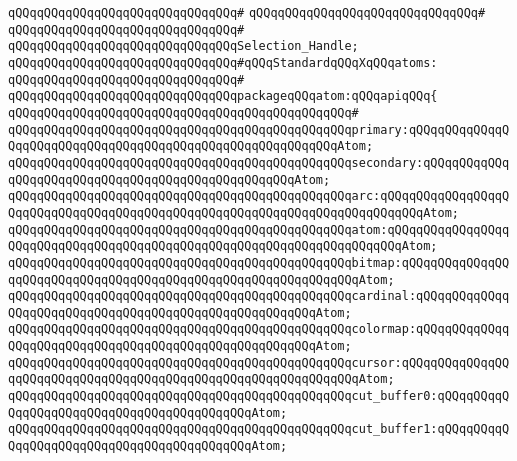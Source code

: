 \verb|qQQqqQQqqQQqqQQqqQQqqQQqqQQqqQQq#|\newline
\verb|qQQqqQQqqQQqqQQqqQQqqQQqqQQqqQQq#|\newline
\verb|qQQqqQQqqQQqqQQqqQQqqQQqqQQqqQQq#|\newline
\newline
\verb|qQQqqQQqqQQqqQQqqQQqqQQqqQQqqQQqSelection_Handle;|\newline
\newline
\verb|qQQqqQQqqQQqqQQqqQQqqQQqqQQqqQQq#qQQqStandardqQQqXqQQqatoms:|\newline
\verb|qQQqqQQqqQQqqQQqqQQqqQQqqQQqqQQq#|\newline
\verb|qQQqqQQqqQQqqQQqqQQqqQQqqQQqqQQqpackageqQQqatom:qQQqapiqQQq{|\newline
\verb|qQQqqQQqqQQqqQQqqQQqqQQqqQQqqQQqqQQqqQQqqQQqqQQq#|\newline
\verb|qQQqqQQqqQQqqQQqqQQqqQQqqQQqqQQqqQQqqQQqqQQqqQQqprimary:qQQqqQQqqQQqqQQqqQQqqQQqqQQqqQQqqQQqqQQqqQQqqQQqqQQqqQQqqQQqAtom;|\newline
\verb|qQQqqQQqqQQqqQQqqQQqqQQqqQQqqQQqqQQqqQQqqQQqqQQqsecondary:qQQqqQQqqQQqqQQqqQQqqQQqqQQqqQQqqQQqqQQqqQQqqQQqqQQqAtom;|\newline
\verb|qQQqqQQqqQQqqQQqqQQqqQQqqQQqqQQqqQQqqQQqqQQqqQQqarc:qQQqqQQqqQQqqQQqqQQqqQQqqQQqqQQqqQQqqQQqqQQqqQQqqQQqqQQqqQQqqQQqqQQqqQQqqQQqAtom;|\newline
\verb|qQQqqQQqqQQqqQQqqQQqqQQqqQQqqQQqqQQqqQQqqQQqqQQqatom:qQQqqQQqqQQqqQQqqQQqqQQqqQQqqQQqqQQqqQQqqQQqqQQqqQQqqQQqqQQqqQQqqQQqqQQqAtom;|\newline
\verb|qQQqqQQqqQQqqQQqqQQqqQQqqQQqqQQqqQQqqQQqqQQqqQQqbitmap:qQQqqQQqqQQqqQQqqQQqqQQqqQQqqQQqqQQqqQQqqQQqqQQqqQQqqQQqqQQqqQQqAtom;|\newline
\verb|qQQqqQQqqQQqqQQqqQQqqQQqqQQqqQQqqQQqqQQqqQQqqQQqcardinal:qQQqqQQqqQQqqQQqqQQqqQQqqQQqqQQqqQQqqQQqqQQqqQQqqQQqqQQqAtom;|\newline
\verb|qQQqqQQqqQQqqQQqqQQqqQQqqQQqqQQqqQQqqQQqqQQqqQQqcolormap:qQQqqQQqqQQqqQQqqQQqqQQqqQQqqQQqqQQqqQQqqQQqqQQqqQQqqQQqAtom;|\newline
\verb|qQQqqQQqqQQqqQQqqQQqqQQqqQQqqQQqqQQqqQQqqQQqqQQqcursor:qQQqqQQqqQQqqQQqqQQqqQQqqQQqqQQqqQQqqQQqqQQqqQQqqQQqqQQqqQQqqQQqAtom;|\newline
\verb|qQQqqQQqqQQqqQQqqQQqqQQqqQQqqQQqqQQqqQQqqQQqqQQqcut_buffer0:qQQqqQQqqQQqqQQqqQQqqQQqqQQqqQQqqQQqqQQqqQQqAtom;|\newline
\verb|qQQqqQQqqQQqqQQqqQQqqQQqqQQqqQQqqQQqqQQqqQQqqQQqcut_buffer1:qQQqqQQqqQQqqQQqqQQqqQQqqQQqqQQqqQQqqQQqqQQqAtom;|\newline
